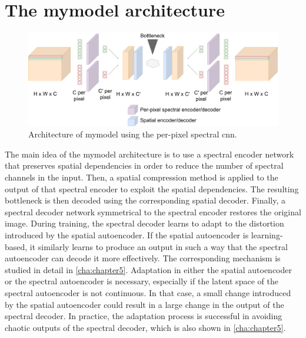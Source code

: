 \section{The \ac{mymodel} architecture\label{sec:combinedmodel}}
\begin{figure}
\centering
\includegraphics[scale=0.18]{img/GeneralArchitecture.pdf}
\caption[\ac{mymodel} architecture]{Architecture of \ac{mymodel} using the per-pixel spectral \ac{cnn}.}
\label{fig:combined}
\end{figure}

The main idea of the \ac{mymodel} architecture is to use a spectral encoder network that preserves spatial dependencies in order to reduce the number of spectral channels in the input. Then, a spatial compression method is applied to the output of that spectral encoder to exploit the spatial dependencies. The resulting bottleneck is then decoded using the corresponding spatial decoder. Finally, a spectral decoder network symmetrical to the spectral encoder restores the original image. During training, the spectral decoder learns to adapt to the distortion introduced by the spatial autoencoder. If the spatial autoencoder is learning-based, it similarly learns to produce an output in such a way that the spectral autoencoder can decode it more effectively. The corresponding mechanism is studied in detail in \autoref{cha:chapter5}. Adaptation in either the spatial autoencoder or the spectral autoencoder is necessary, especially if the latent space of the spectral autoencoder is not continuous. In that case, a small change introduced by the spatial autoencoder could result in a large change in the output of the spectral decoder. In practice, the adaptation process is successful in avoiding chaotic outputs of the spectral decoder, which is also shown in \autoref{cha:chapter5}.

